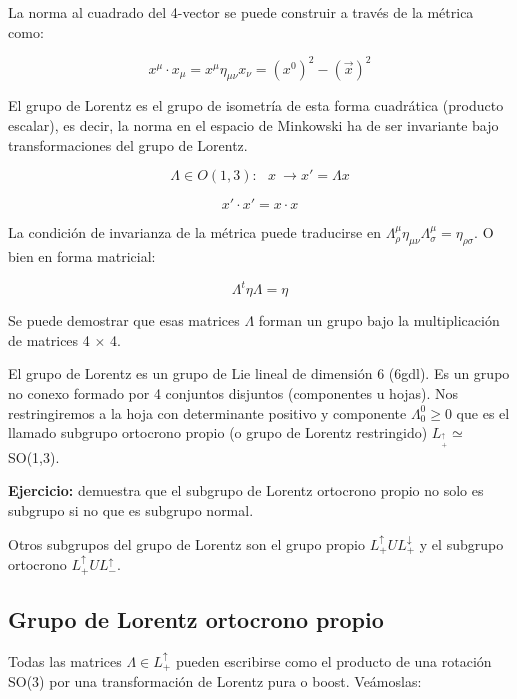 \documentclass{article}
\begin{document}
La norma al cuadrado del 4-vector se puede construir a través de la métrica como:

$$x^\mu \cdot x_\mu = x^\mu \eta _{\mu \nu} x_\nu= (x^0)^2 - (\Vec{x})^2$$

El grupo de Lorentz es el grupo de isometría de esta forma cuadrática (producto escalar), es decir, la norma en el espacio de Minkowski ha de ser invariante bajo transformaciones del grupo de Lorentz.

$$\Lambda \in O(1,3): \ \ \ x \ \longrightarrow x'=\Lambda x$$

$$x'\cdot x' =x\cdot x$$

La condición de invarianza de la métrica puede traducirse en $\Lambda ^\mu _\rho \eta _{\mu \nu} \Lambda ^\mu _\sigma =\eta _{\rho \sigma}$. O bien en forma matricial:

$$\Lambda ^t \eta \Lambda =\eta$$


Se puede demostrar que esas matrices $\Lambda$ forman un grupo bajo la multiplicación de matrices 4 $\times$ 4.

\smallskip
El grupo de Lorentz es un grupo de Lie lineal de dimensión 6 (6gdl). Es un grupo no conexo formado por 4 conjuntos disjuntos (componentes u hojas). Nos restringiremos a la hoja con determinante positivo y componente $\Lambda _0^0 \geq 0$ que es el llamado subgrupo ortocrono propio (o grupo de Lorentz restringido) $L__+^\uparrow \simeq$ SO(1,3).

\smallskip
\textbf{Ejercicio:} demuestra que el subgrupo de Lorentz ortocrono propio no solo es subgrupo si no que es subgrupo normal.

Otros subgrupos del grupo de Lorentz son el grupo propio $L_+^\uparrow U L_+^\downarrow$ y el subgrupo ortocrono $L_+^\uparrow U L_-^\uparrow$.

\subsection{Grupo de Lorentz ortocrono propio}

Todas las matrices $\Lambda \in L_+^\uparrow$ pueden escribirse como el producto de una rotación SO(3) por una transformación de Lorentz pura o boost. Veámoslas:
\end{document}
